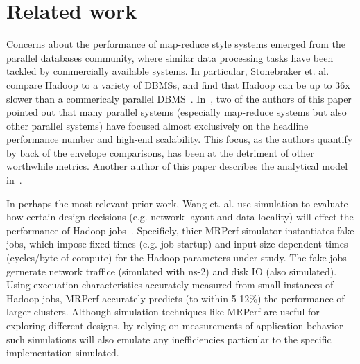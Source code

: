 
\section{Related work}
\label{sec:related_work}

Concerns about the performance of map-reduce style systems emerged
from the parallel databases community, where similar data processing
tasks have been tackled by commercially available systems. In
particular, Stonebraker et. al. compare Hadoop to a variety of DBMSs,
and find that Hadoop can be up to 36x slower than a commericaly
parallel DBMS~\cite{stonebraker-mr}.
In~\cite{efficiencymatters}, two of the authors of this paper
pointed out that many parallel systems (especially map-reduce systems
but also other parallel systems) have focused almost exclusively on
the headline performance number and high-end scalability.  This focus,
as the authors quantify by back of the envelope comparisons, has been
at the detriment of other worthwhile metrics.  Another author of this
paper describes the analytical model in~\cite{tshiranthesis}.

In perhaps the most relevant prior work, Wang et. al. use simulation
to evaluate how certain design decisions (e.g. network layout and data
locality) will effect the performance of Hadoop
jobs~\cite{mr-simulation}.  Specificly, thier MRPerf simulator
instantiates fake jobs, which impose fixed times (e.g. job startup)
and input-size dependent times (cycles/byte of compute) for the Hadoop
parameters under study. The fake jobs gernerate network traffice
(simulated with ns-2) and disk IO (also simulated).  Using execuation
characteristics accurately measured from small instances of Hadoop
jobs, MRPerf accurately predicts (to within 5-12\%) the performance
of larger clusters.  Although simulation techniques like MRPerf are
useful for exploring different designs, by relying on measurements of
application behavior such simulations will also emulate any
inefficiencies particular to the specific implementation simulated.








